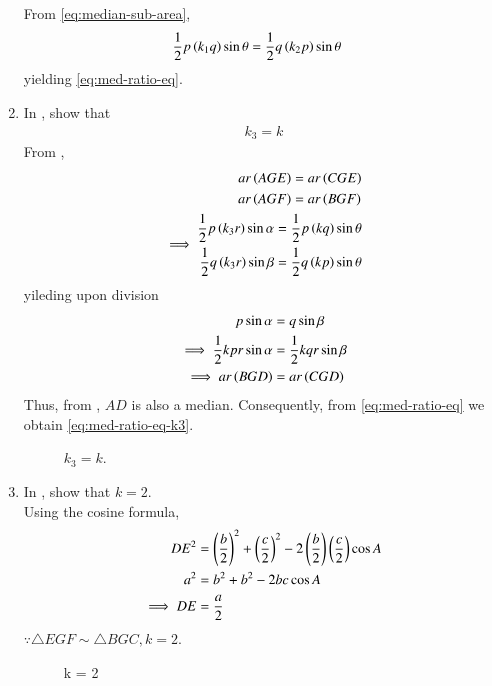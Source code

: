 \begin{enumerate}[label=\thesubsection.\arabic*.,ref=\thesubsection.\theenumi]
\begin{figure}[!ht]
\end{figure}
\solution
	From \eqref{eq:median-sub-area},
\begin{align}
	\frac{1}{2}p\left(k_1q\right) \sin \theta
	&=\frac{1}{2}q\left(k_2p\right)\sin \theta
\end{align}
	yielding \eqref{eq:med-ratio-eq}.
\item In 
	, show that 	
\begin{align}
	k_3 = k
\label{eq:med-ratio-eq-k3}
\end{align}
\solution 
	From ,
\begin{align}
\begin{split}
	ar\left(AGE\right)
	&=ar\left(CGE\right)
	\\
	ar\left(AGF\right)
	&=ar\left(BGF\right)
\end{split}
\\
\implies
\begin{split}
	\frac{1}{2}p\left(k_3r\right)\sin \alpha
	&=\frac{1}{2}p\left(kq\right)\sin \theta
	\\
	\frac{1}{2}q\left(k_3r\right)\sin \beta
	&=\frac{1}{2}q\left(kp\right) \sin \theta
\end{split}
\end{align}
yileding upon division
\begin{align}
	p\sin \alpha &= q \sin \beta
	\\
	\implies 
	\frac{1}{2}kpr\sin \alpha &= \frac{1}{2}kqr \sin \beta
	\\
	\implies ar\left(BGD\right)
	&=ar\left(CGD\right)
\end{align}
Thus, 
	from , $AD$ is also a median.
	Consequently, 
	from
	\eqref{eq:med-ratio-eq} we obtain
\eqref{eq:med-ratio-eq-k3}.
%
\begin{figure}[H]
	\begin{center}
		\resizebox{0.6\columnwidth}{!}{}
	\end{center}
	\caption{$k_3=k$.}
	\label{fig:tri_med_meet}	
\end{figure}
\item In 
	, show that $k = 2$.
	\\
\solution Using the cosine formula, 
\begin{align}
	DE^2 &= \left(\frac{b}{2}\right)^2+\left(\frac{c}{2}\right)^2-2\left(\frac{b}{2}\right)\left(\frac{c}{2}\right)\cos A  
	\\
	a^2&= b^2+b^2-2bc\cos A  
	\\
	\implies DE &= \frac{a}{2}
\end{align}
$\because \triangle EGF \sim \triangle BGC, k = 2$.
\begin{figure}[H]
	\begin{center}
		\resizebox{0.6\columnwidth}{!}{}
	\end{center}
	\caption{k = 2}
	\label{fig:tri_med_sim}
\end{figure}


\end{enumerate}

